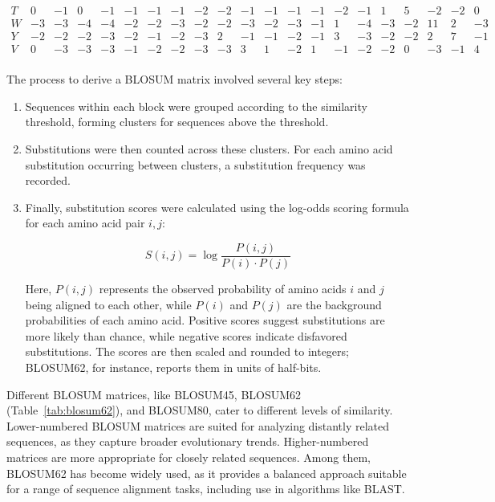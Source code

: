 \begin{table}[tbp]
\[\begin{array}{c|rrrrrrrrrrrrrrrrrrrr}
T  &  0 & -1 &  0 & -1 & -1 & -1 & -1 & -2 & -2 & -1 & -1 & -1 & -1 & -2 & -1 &  1 &  5 & -2 & -2 &  0 \\
W  & -3 & -3 & -4 & -4 & -2 & -2 & -3 & -2 & -2 & -3 & -2 & -3 & -1 &  1 & -4 & -3 & -2 & 11 &  2 & -3 \\
Y  & -2 & -2 & -2 & -3 & -2 & -1 & -2 & -3 &  2 & -1 & -1 & -2 & -1 &  3 & -3 & -2 & -2 &  2 &  7 & -1 \\
V  &  0 & -3 & -3 & -3 & -1 & -2 & -2 & -3 & -3 &  3 &  1 & -2 &  1 & -1 & -2 & -2 &  0 & -3 & -1 &  4 \\
\end{array}
\]
\end{table}

The process to derive a BLOSUM matrix involved several key steps:
\begin{enumerate}
    \item Sequences within each block were grouped according to the similarity threshold, forming clusters for sequences above the threshold.
    \item Substitutions were then counted across these clusters. For each amino acid substitution occurring between clusters, a substitution frequency was recorded.
    \item Finally, substitution scores were calculated using the log-odds scoring formula for each amino acid pair $i, j$:
    
    \begin{equation}
    S(i, j) = \log \frac{P(i, j)}{P(i) \cdot P(j)}
    \end{equation}
    
    Here, $P(i, j)$ represents the observed probability of amino acids $i$ and $j$ being aligned to each other, while $P(i)$ and $P(j)$ are the background probabilities of each amino acid. Positive scores suggest substitutions are more likely than chance, while negative scores indicate disfavored substitutions. The scores are then scaled and rounded to integers; BLOSUM62, for instance, reports them in units of half-bits.
\end{enumerate}

Different BLOSUM matrices, like BLOSUM45, BLOSUM62 (Table~\ref{tab:blosum62}), and BLOSUM80, cater to different levels of similarity. Lower-numbered BLOSUM matrices are suited for analyzing distantly related sequences, as they capture broader evolutionary trends. Higher-numbered matrices are more appropriate for closely related sequences. Among them, BLOSUM62 has become widely used, as it provides a balanced approach suitable for a range of sequence alignment tasks, including use in algorithms like BLAST.

